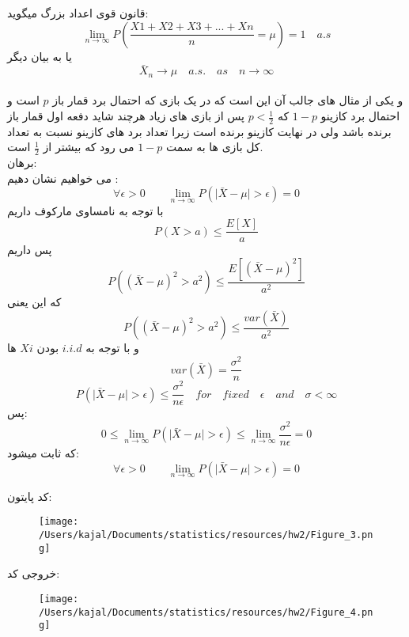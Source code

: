 \problem{}
\subproblem{}
قانون قوی اعداد بزرگ میگوید:\\
\[ \lim_{n \to \infty} P(\frac{X1+X2+X3+...+Xn}{n} = \mu) = 1 \quad a.s\]
یا به بیان دیگر 
\[ \bar{X}_n \to \mu \quad a.s. \quad as \quad n\to\infty \]
\\
و یکی از مثال های جالب آن این است که در یک بازی که احتمال برد قمار باز $p$ است و احتمال برد کازینو \(1-p\) که $p<\frac{1}{2}$
پس از بازی های زیاد هرچند شاید دفعه اول قمار باز برنده باشد ولی در نهایت کازینو برنده است زیرا تعداد برد های کازینو نسبت به تعداد کل بازی ها به سمت \(1-p\) می رود که
بیشتر از $\frac{1}{2}$ است.\\

\subproblem{}
برهان:\\
می خواهیم نشان دهیم :\\ 
\[ \forall \epsilon >0 \quad \quad \lim_{{n \to \infty}} P(\lvert \bar{X} - \mu \rvert > \epsilon) = 0 \]
با توجه به نامساوی مارکوف داریم\\
\[P(X>a)\leq \frac{E[X]}{a} \] 
پس داریم
\[P((\bar{X} - \mu)^2>a^2)\leq\frac{E[( \bar{X} - \mu)^2]}{a^2} \] 
که این یعنی
\[P((\bar{X} - \mu)^2>a^2)\leq \frac{var(\bar{X})}{a^2} \] 
و با توجه به $i.i.d$ بودن $Xi$ ها 
\[var(\bar{X}) = \frac{\sigma^2}{n}\]
\[ P(\lvert \bar{X} - \mu \rvert > \epsilon ) \leq \frac{\sigma^2}{n\epsilon} \quad for \quad fixed \quad \epsilon \quad and \quad  \sigma<\infty\] 
پس:
\[0 \leq \lim_{{n \to \infty}} P(\lvert \bar{X} - \mu \rvert > \epsilon) \leq \lim_{{n \to \infty}} \frac{\sigma^2}{n\epsilon} = 0 \]
که ثابت میشود:
\[ \forall \epsilon >0 \quad \quad \lim_{{n \to \infty}} P(\lvert \bar{X} - \mu \rvert > \epsilon) = 0 \]

\subproblem{}
کد پایتون:\\
\begin{figure}[H]
	\centering
	\texttt{[image: /Users/kajal/Documents/statistics/resources/hw2/Figure\_3.png]}
\end{figure}

خروجی کد:
\begin{figure}[H]
	\centering
	\texttt{[image: /Users/kajal/Documents/statistics/resources/hw2/Figure\_4.png]}
\end{figure}
